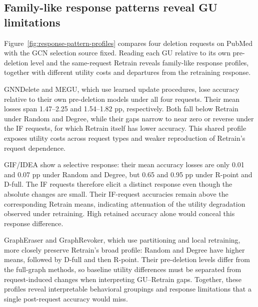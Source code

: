 \subsection{Family-like response patterns reveal GU limitations}
Figure~\ref{fig:response-pattern-profiles} compares four deletion requests on PubMed with the GCN selection source fixed. Reading each GU relative to its own pre-deletion level and the same-request Retrain reveals family-like response profiles, together with different utility costs and departures from the retraining response.

GNNDelete and MEGU, which use learned update procedures, lose accuracy relative to their own pre-deletion models under all four requests. Their mean losses span 1.47--2.25 and 1.54--1.82 pp, respectively. Both fall below Retrain under Random and Degree, while their gaps narrow to near zero or reverse under the IF requests, for which Retrain itself has lower accuracy. This shared profile exposes utility costs across request types and weaker reproduction of Retrain's request dependence.

GIF/IDEA show a selective response: their mean accuracy losses are only 0.01 and 0.07 pp under Random and Degree, but 0.65 and 0.95 pp under R-point and D-full. The IF requests therefore elicit a distinct response even though the absolute changes are small. Their IF-request accuracies remain above the corresponding Retrain means, indicating attenuation of the utility degradation observed under retraining. High retained accuracy alone would conceal this response difference.

GraphEraser and GraphRevoker, which use partitioning and local retraining, more closely preserve Retrain's broad profile: Random and Degree have higher means, followed by D-full and then R-point. Their pre-deletion levels differ from the full-graph methods, so baseline utility differences must be separated from request-induced changes when interpreting GU--Retrain gaps. Together, these profiles reveal interpretable behavioral groupings and response limitations that a single post-request accuracy would miss.

